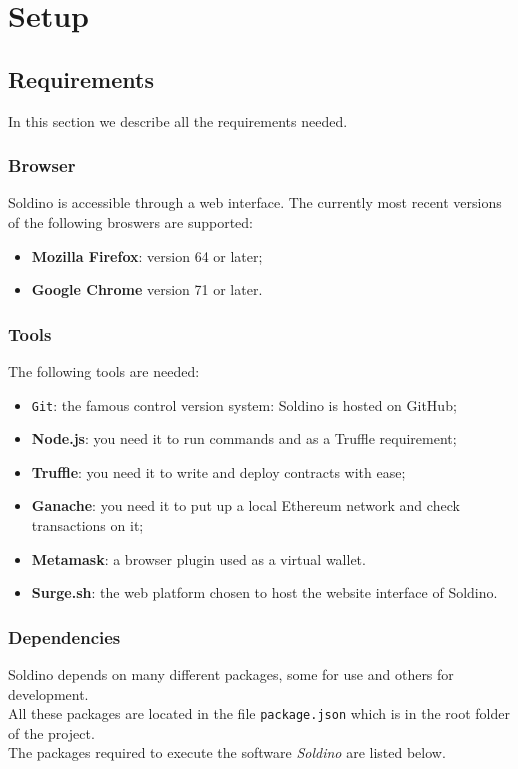 \section{Setup} 
\subsection{Requirements}
In this section we describe all the requirements needed.
\subsubsection{Browser}
Soldino is accessible through a web interface. The currently most recent versions of the following broswers are supported:
\begin{itemize}
	\item \textbf{Mozilla Firefox}: version 64 or later;
	\item \textbf{Google Chrome} version 71 or later.
\end{itemize}

\subsubsection{Tools}
The following tools are needed:
\begin{itemize}
	\item \texttt{Git}: the famous control version system: Soldino is hosted on GitHub;
	\item \textbf{Node.js}: you need it to run commands and as a Truffle requirement;
	\item \textbf{Truffle}: you need it to write and deploy contracts with ease;
	\item \textbf{Ganache}: you need it to put up a local Ethereum network and check transactions on it;
	\item \textbf{Metamask}: a browser plugin used as a virtual wallet.
	\item \textbf{Surge.sh}: the web platform chosen to host the website interface of Soldino.
\end{itemize}

\subsubsection{Dependencies}
Soldino depends on many different packages, some for use and others for development.\\
All these packages are located in the file \texttt{package.json} which is in the root folder of the project.\\
The packages required to execute the software \textit{Soldino} are listed below.\\

